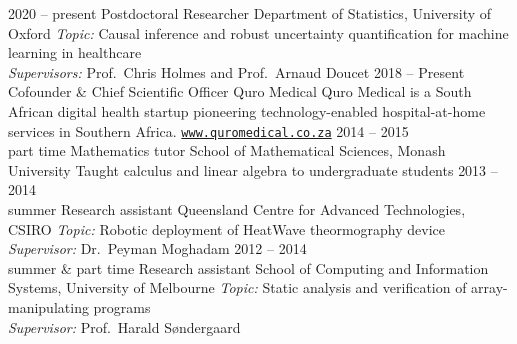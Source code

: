 \documentclass[9pt]{developercv} %
\begin{document}
\begin{entrylist}
    \entry
    {2020 -- present}
    {Postdoctoral Researcher}
    {Department of Statistics, University of Oxford}
    {\textit{Topic:} Causal inference and robust uncertainty quantification for machine learning in healthcare\\
    \textit{Supervisors:} Prof.\ Chris Holmes and Prof.\ Arnaud Doucet}
    \entry
        {2018 -- Present}%
        {Cofounder \& Chief Scientific Officer}
        {Quro Medical}
        {Quro Medical is a South African digital health startup pioneering technology-enabled hospital-at-home services in Southern Africa. \texttt{\href{https://www.quromedical.co.za}{www.quromedical.co.za}}}
    \entry
        {2014 -- 2015\\\footnotesize{part time}}
        {Mathematics tutor}
        {School of Mathematical Sciences, Monash University}
        {Taught calculus and linear algebra to undergraduate students}
    \entry
        {2013 -- 2014\\\footnotesize{summer}}
        {Research assistant}
        {Queensland Centre for Advanced Technologies, CSIRO}
        {\textit{Topic:} Robotic deployment of HeatWave theormography device\\
        \textit{Supervisor:} Dr.\ Peyman Moghadam}
    \entry
        {2012 -- 2014\\\footnotesize{summer \& part time}}
        {Research assistant}
        {School of Computing and Information Systems, University of Melbourne}
        {\textit{Topic:} Static analysis and verification of array-manipulating programs\\
        \textit{Supervisor:} Prof.\ Harald S\o ndergaard}
\end{entrylist}
\end{document}
